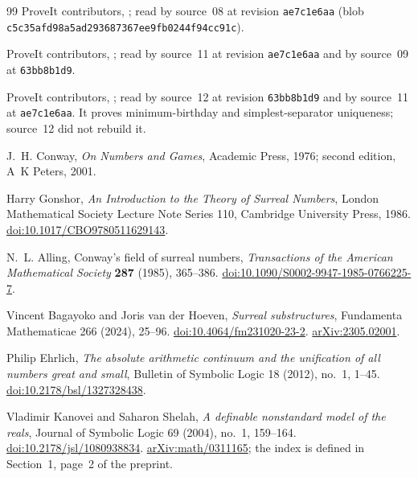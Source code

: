 \documentclass[11pt]{article}
\theoremstyle{definition}
\theoremstyle{remark}
\begin{document}
\begin{thebibliography}{99}
ProveIt contributors, ;
read by source~08 at revision \texttt{ae7c1e6aa} (blob
\texttt{c5c35afd98a5ad293687367ee9fb0244f94cc91c}).

ProveIt contributors, ;
read by source~11 at revision \texttt{ae7c1e6aa} and by source~09 at
\texttt{63bb8b1d9}.

ProveIt contributors, ;
read by source~12 at revision \texttt{63bb8b1d9} and by source~11 at
\texttt{ae7c1e6aa}. It proves minimum-birthday and simplest-separator
uniqueness; source~12 did not rebuild it.

J.~H. Conway,
\emph{On Numbers and Games},
Academic Press, 1976; second edition, A~K Peters, 2001.

Harry Gonshor,
\emph{An Introduction to the Theory of Surreal Numbers},
London Mathematical Society Lecture Note Series 110,
Cambridge University Press, 1986.
\href{https://doi.org/10.1017/CBO9780511629143}{doi:10.1017/CBO9780511629143}.

N.~L. Alling,
Conway's field of surreal numbers,
\emph{Transactions of the American Mathematical Society} \textbf{287} (1985),
365--386.
\href{https://doi.org/10.1090/S0002-9947-1985-0766225-7}{doi:10.1090/S0002-9947-1985-0766225-7}.

Vincent Bagayoko and Joris van der Hoeven,
\emph{Surreal substructures},
Fundamenta Mathematicae 266 (2024), 25--96.
\href{https://doi.org/10.4064/fm231020-23-2}{doi:10.4064/fm231020-23-2}.
\href{https://arxiv.org/abs/2305.02001}{arXiv:2305.02001}.

Philip Ehrlich,
\emph{The absolute arithmetic continuum and the unification
of all numbers great and small},
Bulletin of Symbolic Logic 18 (2012), no.~1, 1--45.
\href{https://doi.org/10.2178/bsl/1327328438}{doi:10.2178/bsl/1327328438}.

Vladimir Kanovei and Saharon Shelah,
\emph{A definable nonstandard model of the reals},
Journal of Symbolic Logic 69 (2004), no.~1, 159--164.
\href{https://doi.org/10.2178/jsl/1080938834}{doi:10.2178/jsl/1080938834}.
\href{https://arxiv.org/abs/math/0311165}{arXiv:math/0311165}; the index is
defined in Section~1, page~2 of the preprint.


\end{thebibliography}
\end{document}
